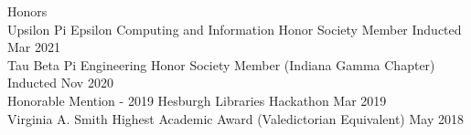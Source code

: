 \documentclass[10pt]{resume} %
\begin{document}
\begin{rSection}{Honors}
\\ { Upsilon Pi Epsilon Computing and Information Honor Society Member } \hfill { Inducted Mar 2021 }
\\ { Tau Beta Pi Engineering Honor Society Member (Indiana Gamma Chapter) } \hfill { Inducted Nov 2020 }
\\ { Honorable Mention - 2019 Hesburgh Libraries Hackathon } \hfill { Mar 2019 }
\\ { Virginia A. Smith Highest Academic Award (Valedictorian Equivalent) } \hfill { May 2018 }
\end{rSection}









\newpage
\end{document}
